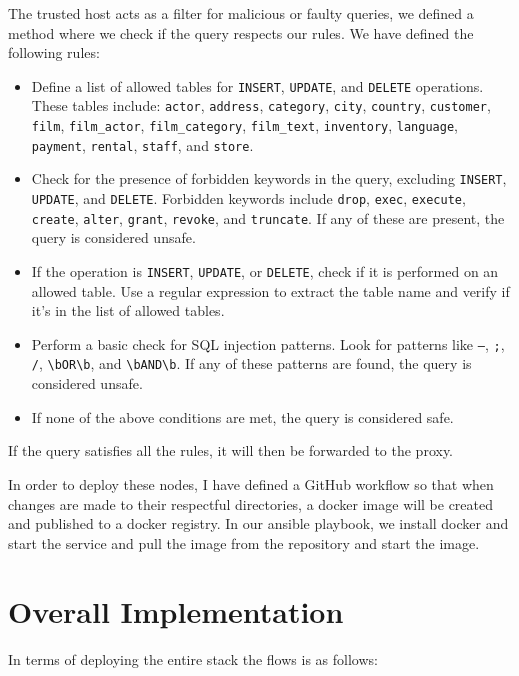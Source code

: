 \documentclass[11pt]{article}
\begin{document}
The trusted host acts as a filter for malicious or faulty queries, we defined a method where we check if the query respects our rules. We have defined the following rules:
\begin{itemize}
    \item Define a list of allowed tables for \texttt{INSERT}, \texttt{UPDATE}, and \texttt{DELETE} operations. These tables include: \texttt{actor}, \texttt{address}, \texttt{category}, \texttt{city}, \texttt{country}, \texttt{customer}, \texttt{film}, \texttt{film\_actor}, \texttt{film\_category}, \texttt{film\_text}, \texttt{inventory}, \texttt{language}, \texttt{payment}, \texttt{rental}, \texttt{staff}, and \texttt{store}.
    \item Check for the presence of forbidden keywords in the query, excluding \texttt{INSERT}, \texttt{UPDATE}, and \texttt{DELETE}. Forbidden keywords include \texttt{drop}, \texttt{exec}, \texttt{execute}, \texttt{create}, \texttt{alter}, \texttt{grant}, \texttt{revoke}, and \texttt{truncate}. If any of these are present, the query is considered unsafe.
    \item If the operation is \texttt{INSERT}, \texttt{UPDATE}, or \texttt{DELETE}, check if it is performed on an allowed table. Use a regular expression to extract the table name and verify if it's in the list of allowed tables.
    \item Perform a basic check for SQL injection patterns. Look for patterns like \texttt{--}, \texttt{;}, \texttt{/\*}, \texttt{\textbackslash bOR\textbackslash b}, and \texttt{\textbackslash bAND\textbackslash b}. If any of these patterns are found, the query is considered unsafe.
    \item If none of the above conditions are met, the query is considered safe.
\end{itemize}
If the query satisfies all the rules, it will then be forwarded to the proxy.
\newline

In order to deploy these nodes, I have defined a GitHub workflow so that when changes are made to their respectful directories, a docker image will be created and published to a docker registry. In our ansible playbook, we install docker and start the service and pull the image from the repository and start the image.

\section{Overall Implementation}
In terms of deploying the entire stack the flows is as follows:
\newline
\end{document}
